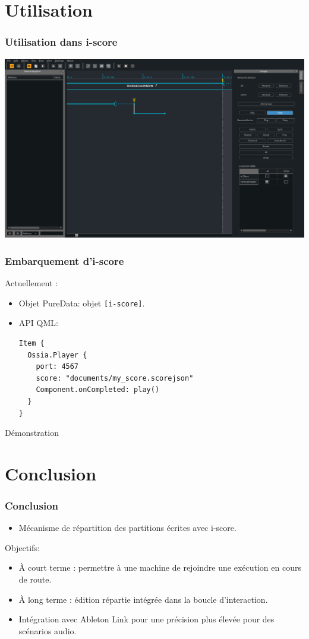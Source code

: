 \documentclass[handout]{beamer}
\begin{document}
\section{Utilisation}
\begin{frame}
\frametitle{Utilisation dans i-score}
\centering
\includegraphics[width=\textwidth]{images/score.png}
\end{frame}

\begin{frame}[fragile]
\frametitle{Embarquement d'i-score}
Actuellement : 
\begin{itemize}
    \item Objet PureData: objet \lstinline|[i-score]|.
    \item API QML:
    \begin{lstlisting}
Item {
  Ossia.Player {
    port: 4567
    score: "documents/my_score.scorejson"
    Component.onCompleted: play()
  }
}
    \end{lstlisting}
\end{itemize}
\end{frame}

\begin{frame}
\Huge
\centering
Démonstration
\end{frame}


\section{Conclusion}
\begin{frame}
    \frametitle{Conclusion}  
    \Large
    \begin{itemize}
        \item<1> Mécanisme de répartition des partitions écrites avec i-score.
    \end{itemize}

    Objectifs:
    \begin{itemize}
        \item<1> À court terme : permettre à une machine de rejoindre une exécution en cours de route.
        \item<2> À long terme : édition répartie intégrée dans la boucle d'interaction.
        \item<3> Intégration avec Ableton Link pour une précision plus élevée pour des scénarios audio.
    \end{itemize}
\end{frame}
\end{document}
